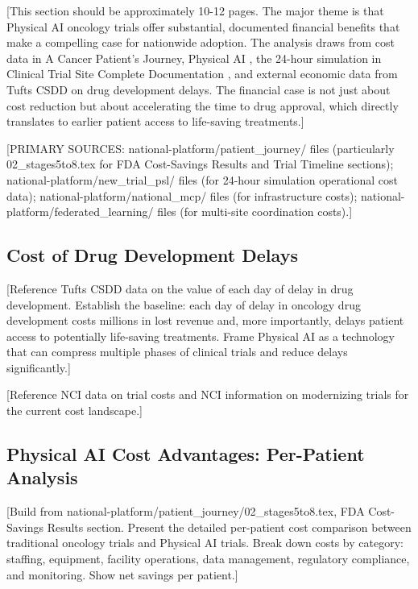 
[This section should be approximately 10-12 pages. The major theme is that
Physical AI oncology trials offer substantial, documented financial benefits
that make a compelling case for nationwide adoption. The analysis draws from
cost data in A Cancer Patient's Journey, Physical AI
\cite{patient-journey-paper}, the 24-hour simulation in Clinical Trial Site
Complete Documentation \cite{site-docs}, and external economic data from
Tufts CSDD \cite{tufts-delay} on drug development delays. The financial case
is not just about cost reduction but about accelerating the time to drug
approval, which directly translates to earlier patient access to
life-saving treatments.]

[PRIMARY SOURCES: national-platform/patient\_journey/ files (particularly
02\_stages5to8.tex for FDA Cost-Savings Results and Trial Timeline sections);
national-platform/new\_trial\_psl/ files (for 24-hour simulation operational
cost data); national-platform/national\_mcp/ files (for infrastructure costs);
national-platform/federated\_learning/ files (for multi-site coordination
costs).]

\subsection{Cost of Drug Development Delays}
\label{subsec:financial-delays}

[Reference Tufts CSDD \cite{tufts-delay} data on the value of each day of
delay in drug development. Establish the baseline: each day of delay in
oncology drug development costs millions in lost revenue and, more importantly,
delays patient access to potentially life-saving treatments. Frame Physical AI
as a technology that can compress multiple phases of clinical trials and
reduce delays significantly.]

[Reference NCI data on trial costs \cite{nci-trials-paying} and NCI information
on modernizing trials \cite{nci-modernizing} for the current cost landscape.]

\subsection{Physical AI Cost Advantages: Per-Patient Analysis}
\label{subsec:financial-per-patient}

[Build from national-platform/patient\_journey/02\_stages5to8.tex, FDA
Cost-Savings Results section. Present the detailed per-patient cost comparison
between traditional oncology trials and Physical AI trials. Break down costs
by category: staffing, equipment, facility operations, data management,
regulatory compliance, and monitoring. Show net savings per patient.]

